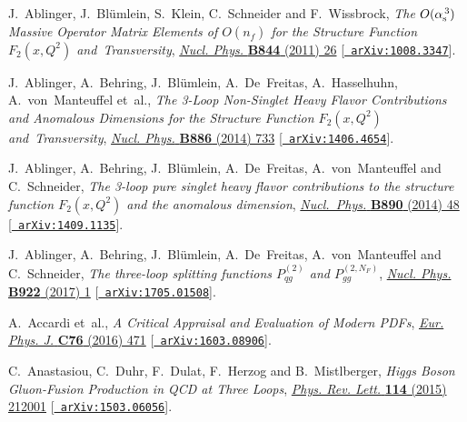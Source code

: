 \documentclass[12pt]{article}
\def\as(#1){{\alpha_{\rm s}^{\,#1}}}
\def\nf{{n^{}_{\! f}}}
\begin{document}
{\begin{thebibliography}{100}
J.~Ablinger, J.~Bl{\"u}mlein, S.~Klein, C.~Schneider and F.~Wissbrock,
  \emph{{The $O(\as(3))$ Massive Operator Matrix Elements of $O(\nf)$ for the
  Structure Function $F_2(x,Q^2)$ and~Transversity}},
  \href{https://dx.doi.org/10.1016/j.nuclphysb.2010.10.021}{\emph{Nucl. Phys.}
  {\bf B844} (2011) 26} [\href{https://arxiv.org/abs/1008.3347}{{\tt
  arXiv:1008.3347}}].

J.~Ablinger, A.~Behring, J.~Bl{\"u}mlein, A.~De~Freitas, A.~Hasselhuhn,
  A.~von~Manteuffel et~al., \emph{{The 3-Loop Non-Singlet Heavy Flavor
  Contributions and Anomalous Dimensions for the Structure Function
  $F_2(x,Q^2)$ and~Transversity}},
  \href{https://dx.doi.org/10.1016/j.nuclphysb.2014.07.010}{\emph{Nucl. Phys.}
  {\bf B886} (2014) 733} [\href{https://arxiv.org/abs/1406.4654}{{\tt
  arXiv:1406.4654}}].

J.~Ablinger, A.~Behring, J.~Bl{\"u}mlein, A.~De~Freitas, A.~von~Manteuffel and
  C.~Schneider, \emph{{The 3-loop pure singlet heavy flavor contributions to
  the structure function $F_2(x,Q^2)$ and the anomalous dimension}},
  \href{https://dx.doi.org/10.1016/j.nuclphysb.2014.10.008}{\emph{Nucl.~Phys.}
  {\bf B890} (2014) 48} [\href{https://arxiv.org/abs/1409.1135}{{\tt
  arXiv:1409.1135}}].

J.~Ablinger, A.~Behring, J.~Bl{\"u}mlein, A.~De~Freitas, A.~von~Manteuffel and
  C.~Schneider, \emph{{The three-loop splitting functions $P_{qg}^{(2)}$ and
  $P_{gg}^{(2, N_F)}$}},
  \href{https://dx.doi.org/10.1016/j.nuclphysb.2017.06.004}{\emph{Nucl. Phys.}
  {\bf B922} (2017) 1} [\href{https://arxiv.org/abs/1705.01508}{{\tt
  arXiv:1705.01508}}].

A.~Accardi et~al., \emph{{A Critical Appraisal and Evaluation of Modern PDFs}},
  \href{https://dx.doi.org/10.1140/epjc/s10052-016-4285-4}{\emph{Eur. Phys. J.}
  {\bf C76} (2016) 471} [\href{https://arxiv.org/abs/1603.08906}{{\tt
  arXiv:1603.08906}}].

C.~Anastasiou, C.~Duhr, F.~Dulat, F.~Herzog and B.~Mistlberger, \emph{{Higgs
  Boson Gluon-Fusion Production in QCD at Three Loops}},
  \href{https://dx.doi.org/10.1103/PhysRevLett.114.212001}{\emph{Phys. Rev.
  Lett.} {\bf 114} (2015) 212001} [\href{https://arxiv.org/abs/1503.06056}{{\tt
  arXiv:1503.06056}}].


\end{thebibliography}}
\end{document}
